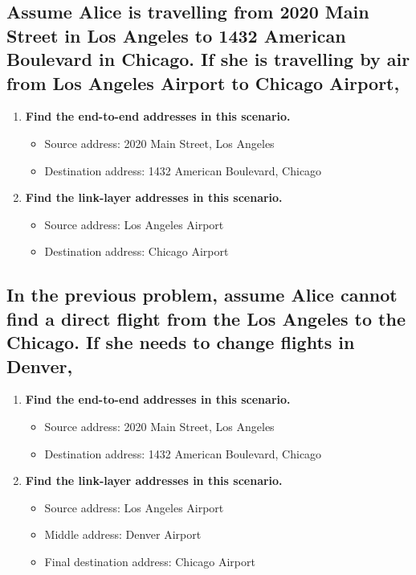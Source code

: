 \documentclass{article}
\begin{document}
\subsection{
	Assume Alice is travelling from 2020 Main Street in Los Angeles to 1432 American
	Boulevard in Chicago. If she is travelling by air from Los Angeles Airport to
	Chicago Airport,
}
\begin{enumerate}
	\item \textbf{ Find the end-to-end addresses in this scenario. }
	      \begin{itemize}
		      \item Source address: 2020 Main Street, Los Angeles
		      \item Destination address: 1432 American Boulevard, Chicago
	      \end{itemize}
	\item \textbf{ Find the link-layer addresses in this scenario. }
	      \begin{itemize}
		      \item Source address: Los Angeles Airport
		      \item Destination address: Chicago Airport
	      \end{itemize}
\end{enumerate}

\subsection{
	In the previous problem, assume Alice cannot find a direct flight from the Los
	Angeles to the Chicago. If she needs to change flights in Denver,
}
\begin{enumerate}
	\item \textbf{ Find the end-to-end addresses in this scenario. }
	      \begin{itemize}
		      \item Source address: 2020 Main Street, Los Angeles
		      \item Destination address: 1432 American Boulevard, Chicago
	      \end{itemize}
	\item \textbf{ Find the link-layer addresses in this scenario. }
	      \begin{itemize}
		      \item Source address: Los Angeles Airport
		      \item Middle address: Denver Airport
		      \item Final destination address: Chicago Airport
	      \end{itemize}
\end{enumerate}
\end{document}
